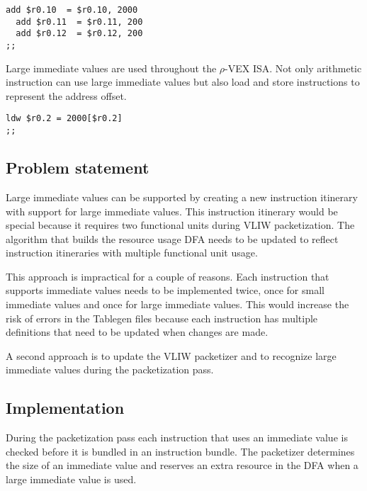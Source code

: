 \begin{lstlisting}[language=rvex]
  add $r0.10  = $r0.10, 2000
  add $r0.11  = $r0.11, 200
  add $r0.12  = $r0.12, 200
;;
\end{lstlisting}

Large immediate values are used throughout the $\rho$-VEX ISA. Not only arithmetic instruction can use large immediate values but also load and store instructions to represent the address offset.

\begin{lstlisting}[language=rvex]
  ldw $r0.2 = 2000[$r0.2]
;;
\end{lstlisting}

\subsection{Problem statement} %
\label{sub:problem_statement}
Large immediate values can be supported by creating a new instruction itinerary with support for large immediate values. This instruction itinerary would be special because it requires two functional units during VLIW packetization. The algorithm that builds the resource usage DFA needs to be updated to reflect instruction itineraries with multiple functional unit usage.

This approach is impractical for a couple of reasons. Each instruction that supports immediate values needs to be implemented twice, once for small immediate values and once for large immediate values. This would increase the risk of errors in the Tablegen files because each instruction has multiple definitions that need to be updated when changes are made.

A second approach is to update the VLIW packetizer and to recognize large immediate values during the packetization pass.


\subsection{Implementation} %
\label{sub:implementation}
During the packetization pass each instruction that uses an immediate value is checked before it is bundled in an instruction bundle. The packetizer determines the size of an immediate value and reserves an extra resource in the DFA when a large immediate value is used.




